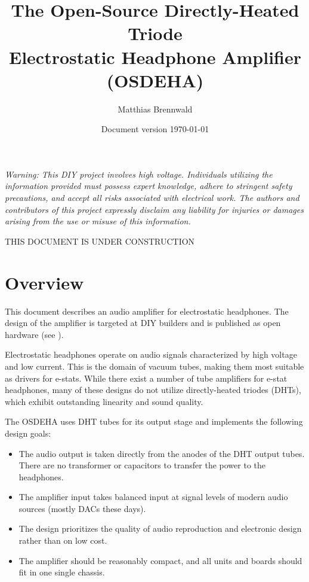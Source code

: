 





\title{The Open-Source Directly-Heated Triode \\ Electrostatic Headphone Amplifier \\ (OSDEHA)}
\author{Matthias Brennwald}
\date{Document version \today}




\maketitle

\emph{Warning: This DIY project involves high voltage. Individuals utilizing the information provided must possess expert knowledge, adhere to stringent safety precautions, and accept all risks associated with electrical work. The authors and contributors of this project expressly disclaim any liability for injuries or damages arising from the use or misuse of this information.}


THIS DOCUMENT IS UNDER CONSTRUCTION


\section{Overview}

This document describes an audio amplifier for electrostatic headphones. The design of the amplifier is targeted at DIY builders and is published as open hardware (see ).

Electrostatic headphones operate on audio signals characterized by high voltage and low current. This is the domain of vacuum tubes, making them most suitable as drivers for e-stats.  While there exist a number of tube amplifiers for e-stat headphones, many of these designs do not utilize directly-heated triodes (DHTs), which exhibit outstanding linearity and sound quality.\par

The OSDEHA uses DHT tubes for its output stage and implements the following design goals:
\begin{itemize}
\item The audio output is taken directly from the anodes of the DHT output tubes. There are no transformer or capacitors to transfer the power to the headphones.
\item The amplifier input takes balanced input at signal levels of modern audio sources (mostly DACs these days).
\item The design prioritizes the quality of audio reproduction and electronic design rather than on low cost.
\item The amplifier should be reasonably compact, and all units and boards should fit in one single chassis.
\end{itemize}


